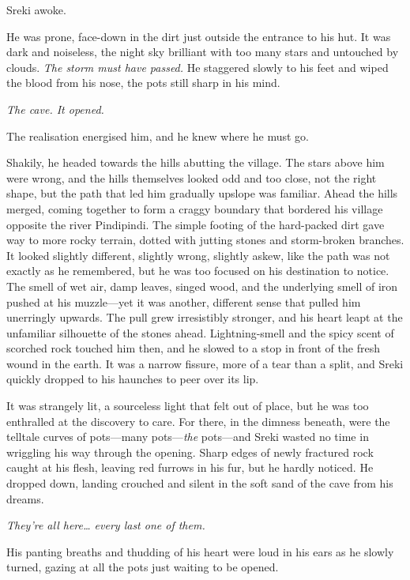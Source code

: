 \secdiv

Sreki awoke.

He was prone, face-down in the dirt just outside the entrance to his hut. It was dark and noiseless, the night sky brilliant with too many stars and untouched by clouds. \emph{The storm must have passed.} He staggered slowly to his feet and wiped the blood from his nose, the pots still sharp in his mind.

\emph{The cave. It opened.}

The realisation energised him, and he knew where he must go.

Shakily, he headed towards the hills abutting the village. The stars above him were wrong, and the hills themselves looked odd and too close, not the right shape, but the path that led him gradually upslope was familiar. Ahead the hills merged, coming together to form a craggy boundary that bordered his village opposite the river Pindipindi. The simple footing of the hard-packed dirt gave way to more rocky terrain, dotted with jutting stones and storm-broken branches. It looked slightly different, slightly wrong, slightly askew, like the path was not exactly as he remembered, but he was too focused on his destination to notice. The smell of wet air, damp leaves, singed wood, and the underlying smell of iron pushed at his muzzle---yet it was another, different sense that pulled him unerringly upwards. The pull grew irresistibly stronger, and his heart leapt at the unfamiliar silhouette of the stones ahead. Lightning-smell and the spicy scent of scorched rock touched him then, and he slowed to a stop in front of the fresh wound in the earth. It was a narrow fissure, more of a tear than a split, and Sreki quickly dropped to his haunches to peer over its lip.

It was strangely lit, a sourceless light that felt out of place, but he was too enthralled at the discovery to care. For there, in the dimness beneath, were the telltale curves of pots---many pots---\emph{the} pots---and Sreki wasted no time in wriggling his way through the opening. Sharp edges of newly fractured rock caught at his flesh, leaving red furrows in his fur, but he hardly noticed. He dropped down, landing crouched and silent in the soft sand of the cave from his dreams.

\emph{They're all here\ldots{} every last one of them.}

His panting breaths and thudding of his heart were loud in his ears as he slowly turned, gazing at all the pots just waiting to be opened.

